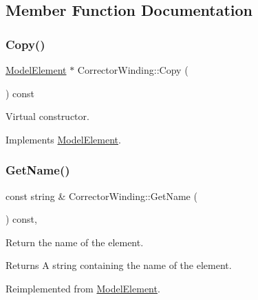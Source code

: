 \subsection{Member Function Documentation}
\mbox{\label{classCorrectorWinding_adb8096ea0f8eb3743747fada685cc62c}} 
\subsubsection{\texorpdfstring{Copy()}{Copy()}}
{\footnotesize\ttfamily \hyperlink{classModelElement}{Model\+Element} $\ast$ Corrector\+Winding\+::\+Copy (\begin{DoxyParamCaption}{ }\end{DoxyParamCaption}) const\hspace{0.3cm}{\ttfamily [virtual]}}

Virtual constructor. 

Implements \hyperlink{classModelElement_ac3ca26d649bd86a0f31a58ae09941429}{Model\+Element}.

\mbox{\label{classCorrectorWinding_afb8a04514388b2b9b0e640b606f8f47c}} 
\subsubsection{\texorpdfstring{Get\+Name()}{GetName()}}
{\footnotesize\ttfamily const string \& Corrector\+Winding\+::\+Get\+Name (\begin{DoxyParamCaption}{ }\end{DoxyParamCaption}) const\hspace{0.3cm}{\ttfamily [inline]}, {\ttfamily [virtual]}}

Return the name of the element. \begin{DoxyReturn}{Returns}
A string containing the name of the element. 
\end{DoxyReturn}


Reimplemented from \hyperlink{classModelElement_ae2bb7fbbbde063a49a02ea6fe22d92c4}{Model\+Element}.

\mbox{\label{classCorrectorWinding_a299195a163660e3bd13e15437a91dd91}} 
